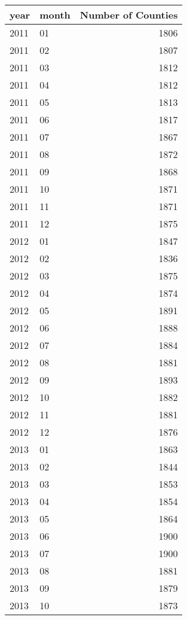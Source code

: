 \begin{tabular}{llr}
  \hline
year & month & Number of Counties \\ 
  \hline
2011 & 01 & 1806 \\ 
  2011 & 02 & 1807 \\ 
  2011 & 03 & 1812 \\ 
  2011 & 04 & 1812 \\ 
  2011 & 05 & 1813 \\ 
  2011 & 06 & 1817 \\ 
  2011 & 07 & 1867 \\ 
  2011 & 08 & 1872 \\ 
  2011 & 09 & 1868 \\ 
  2011 & 10 & 1871 \\ 
  2011 & 11 & 1871 \\ 
  2011 & 12 & 1875 \\ 
  2012 & 01 & 1847 \\ 
  2012 & 02 & 1836 \\ 
  2012 & 03 & 1875 \\ 
  2012 & 04 & 1874 \\ 
  2012 & 05 & 1891 \\ 
  2012 & 06 & 1888 \\ 
  2012 & 07 & 1884 \\ 
  2012 & 08 & 1881 \\ 
  2012 & 09 & 1893 \\ 
  2012 & 10 & 1882 \\ 
  2012 & 11 & 1881 \\ 
  2012 & 12 & 1876 \\ 
  2013 & 01 & 1863 \\ 
  2013 & 02 & 1844 \\ 
  2013 & 03 & 1853 \\ 
  2013 & 04 & 1854 \\ 
  2013 & 05 & 1864 \\ 
  2013 & 06 & 1900 \\ 
  2013 & 07 & 1900 \\ 
  2013 & 08 & 1881 \\ 
  2013 & 09 & 1879 \\ 
  2013 & 10 & 1873 \\ 
   \hline
\end{tabular}
